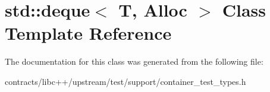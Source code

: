 \hypertarget{classstd_1_1deque}{}\section{std\+:\+:deque$<$ T, Alloc $>$ Class Template Reference}
\label{classstd_1_1deque}


The documentation for this class was generated from the following file\+:\begin{DoxyCompactItemize}
\item 
contracts/libc++/upstream/test/support/container\+\_\+test\+\_\+types.\+h\end{DoxyCompactItemize}
